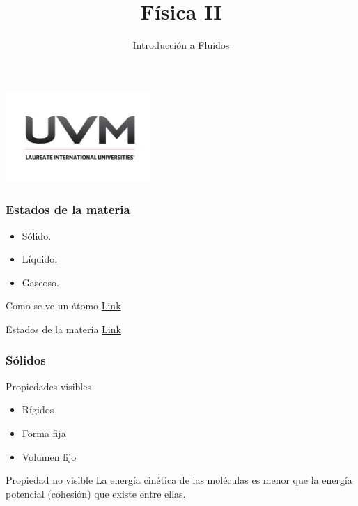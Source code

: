 \documentclass[handout]{beamer}
\title{Física II}
\author{Introducción a Fluidos}
\institute[UVM]{4\textdegree \hspace{2pt} cuatrimestre.}
\begin{document}
\begin{frame}[noframenumbering]
  \titlepage
  \begin{center}
    \includegraphics[width=5.5cm]{uvm1}    
  \end{center}  
\end{frame}




\begin{frame}
  \frametitle{Estados de la materia}
  \begin{itemize}
  \item Sólido.
  \item Líquido.
  \item Gaseoso.
  \end{itemize}

  \begin{block}{Como se ve un átomo}
    \href{https://www.youtube.com/watch?v=yqLlgIaz1L0}{Link}
  \end{block}

  \begin{block}{Estados de la materia}
    \href{https://www.youtube.com/watch?v=s-KvoVzukHo}{Link}
  \end{block}

  
\end{frame}



\begin{frame}
  \frametitle{Sólidos}

  \begin{block}{Propiedades visibles}
    \begin{itemize}
    \item Rígidos
    \item Forma fija
    \item Volumen fijo
    \end{itemize}
  \end{block}

  \begin{block}{Propiedad no visible}
    La energía cinética de las moléculas es menor que la energía potencial (cohesión) que
    existe entre ellas.
  \end{block}
  
\end{frame}
\end{document}
